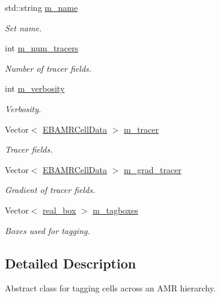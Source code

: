 \begin{DoxyCompactItemize}
std\+::string \hyperlink{classcell__tagger_a9efdcde4e1d4bfbe8b6b59b91875efd5}{m\+\_\+name}
\begin{DoxyCompactList}\small\item\em Set name. \end{DoxyCompactList}\item 
int \hyperlink{classcell__tagger_a23a211cfbb88bf78e7d61b7df4bd53f1}{m\+\_\+num\+\_\+tracers}
\begin{DoxyCompactList}\small\item\em Number of tracer fields. \end{DoxyCompactList}\item 
int \hyperlink{classcell__tagger_a0d980aba108e7b024f89d94232657f5e}{m\+\_\+verbosity}
\begin{DoxyCompactList}\small\item\em Verbosity. \end{DoxyCompactList}\item 
Vector$<$ \hyperlink{type__definitions_8H_a7e610f301989e5e07781c5e338bdb7c3}{E\+B\+A\+M\+R\+Cell\+Data} $>$ \hyperlink{classcell__tagger_a09cfda8cf8ca974f39a56ce5ab5e1829}{m\+\_\+tracer}
\begin{DoxyCompactList}\small\item\em Tracer fields. \end{DoxyCompactList}\item 
Vector$<$ \hyperlink{type__definitions_8H_a7e610f301989e5e07781c5e338bdb7c3}{E\+B\+A\+M\+R\+Cell\+Data} $>$ \hyperlink{classcell__tagger_a8ca300677503a1e619104a5eef82c21c}{m\+\_\+grad\+\_\+tracer}
\begin{DoxyCompactList}\small\item\em Gradient of tracer fields. \end{DoxyCompactList}\item 
Vector$<$ \hyperlink{classreal__box}{real\+\_\+box} $>$ \hyperlink{classcell__tagger_a3f66147925775902886212b74e51c3d2}{m\+\_\+tagboxes}
\begin{DoxyCompactList}\small\item\em Boxes used for tagging. \end{DoxyCompactList}\end{DoxyCompactItemize}


\subsection{Detailed Description}
Abstract class for tagging cells across an A\+MR hierarchy. 

